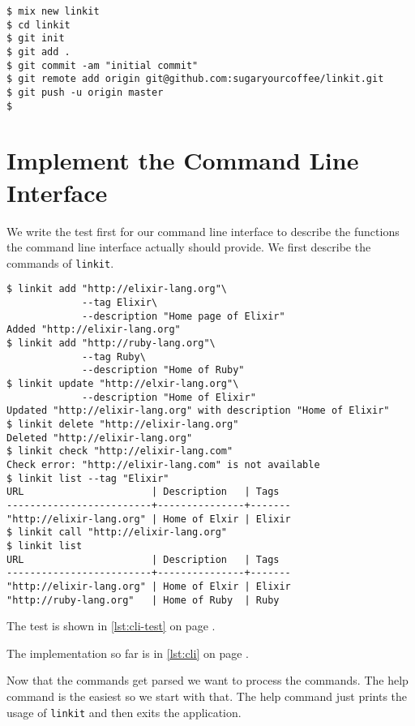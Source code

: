 \documentclass[10pt, a4paper]{article}
\newcommand{\includecode}[3]{}
\begin{document}
\begin{verbatim}
$ mix new linkit
$ cd linkit
$ git init
$ git add .
$ git commit -am "initial commit"
$ git remote add origin git@github.com:sugaryourcoffee/linkit.git
$ git push -u origin master
$
\end{verbatim}

\section{Implement the Command Line Interface}
We write the test first for our command line interface to describe the
functions the command line interface actually should provide. We first 
describe the commands of \texttt{linkit}.

\begin{verbatim}
$ linkit add "http://elixir-lang.org"\
             --tag Elixir\
             --description "Home page of Elixir"
Added "http://elixir-lang.org"
$ linkit add "http://ruby-lang.org"\
             --tag Ruby\
             --description "Home of Ruby"
$ linkit update "http://elxir-lang.org"\
             --description "Home of Elixir"
Updated "http://elixir-lang.org" with description "Home of Elixir"
$ linkit delete "http://elixir-lang.org"
Deleted "http://elixir-lang.org"
$ linkit check "http://elixir-lang.com"
Check error: "http://elixir-lang.com" is not available
$ linkit list --tag "Elixir"
URL                      | Description   | Tags
-------------------------+---------------+-------
"http://elixir-lang.org" | Home of Elxir | Elixir
$ linkit call "http://elixir-lang.org"
$ linkit list
URL                      | Description   | Tags
-------------------------+---------------+-------
"http://elixir-lang.org" | Home of Elxir | Elixir
"http://ruby-lang.org"   | Home of Ruby  | Ruby   
\end{verbatim}

The test is shown in \ref{lst:cli-test} on page \pageref{lst:cli-test}.

\includecode{test/cli\_test.exs}{lst:cli-test}{files/cli_test.exs}

The implementation so far is in \ref{lst:cli} on page \pageref{lst:cli}.

\includecode{lib/linkit/cli.ex}{lst:cli}{files/cli.ex}

Now that the commands get parsed we want to process the commands. The help 
command is the easiest so we start with that. The help command just prints
the usage of \texttt{linkit} and then exits the application.
\end{document}
